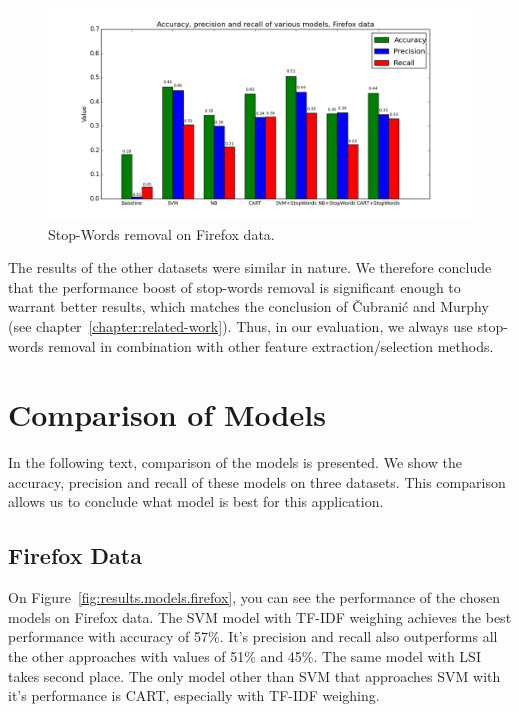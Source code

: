 \begin{figure}[htbp]
    \centering
        \includegraphics[width=\textwidth]{./images/comparison_of_models/firefox_0.png}
    \caption{Stop-Words removal on Firefox data.}
    \label{fig:models.firefox.stopwords}
\end{figure}

The results of the other datasets were similar in nature. We therefore conclude that the performance boost of stop-words removal is significant enough to warrant better results, which matches the conclusion of Čubranić and Murphy~\cite{Murphy} (see chapter~\ref{chapter:related-work}). Thus, in our evaluation, we always use stop-words removal in combination with other feature extraction/selection methods.

\section{Comparison of Models}

In the following text, comparison of the models is presented. We show the accuracy, precision and recall of these models on three datasets. This comparison allows us to conclude what model is best for this application.

\subsection{Firefox Data}

On Figure~\ref{fig:results.models.firefox}, you can see the performance of the chosen models on Firefox data. The SVM model with TF-IDF weighing achieves the best performance with accuracy of 57\%. It's precision and recall also outperforms all the other approaches with values of 51\% and 45\%. The same model with LSI takes second place. The only model other than SVM that approaches SVM with it's performance is CART, especially with TF-IDF weighing.

